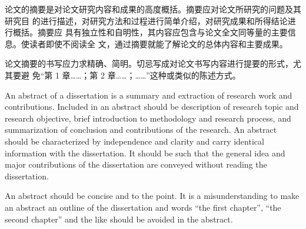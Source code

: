 
\begin{cabstract}  
    论文的摘要是对论文研究内容和成果的高度概括。摘要应对论文所研究的问题及其研究目
    的进行描述，对研究方法和过程进行简单介绍，对研究成果和所得结论进行概括。摘要应
    具有独立性和自明性，其内容应包含与论文全文同等量的主要信息。使读者即使不阅读全
    文，通过摘要就能了解论文的总体内容和主要成果。
  
    论文摘要的书写应力求精确、简明。切忌写成对论文书写内容进行提要的形式，尤其要避
    免“第 1 章……；第 2 章……；……”这种或类似的陈述方式。
  \end{cabstract}
  
  
  \begin{eabstract}
     An abstract of a dissertation is a summary and extraction of research work
     and contributions. Included in an abstract should be description of research
     topic and research objective, brief introduction to methodology and research
     process, and summarization of conclusion and contributions of the
     research. An abstract should be characterized by independence and clarity and
     carry identical information with the dissertation. It should be such that the
     general idea and major contributions of the dissertation are conveyed without
     reading the dissertation.
  
     An abstract should be concise and to the point. It is a misunderstanding to
     make an abstract an outline of the dissertation and words ``the first
     chapter'', ``the second chapter'' and the like should be avoided in the
     abstract.
  \end{eabstract}
  

